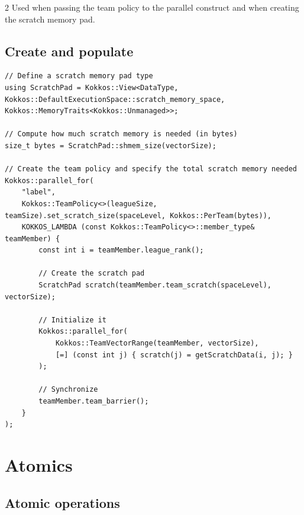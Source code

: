 \documentclass[
    kokkoshighlight,
]{./cheat_sheet_kokkos}
\begin{document}
\begin{multicols}{2}
Used when passing the team policy to the parallel construct and when creating the scratch memory pad.

\subsection{Create and populate}

\begin{verbatim}
// Define a scratch memory pad type
using ScratchPad = Kokkos::View<DataType, Kokkos::DefaultExecutionSpace::scratch_memory_space, Kokkos::MemoryTraits<Kokkos::Unmanaged>>;

// Compute how much scratch memory is needed (in bytes)
size_t bytes = ScratchPad::shmem_size(vectorSize);

// Create the team policy and specify the total scratch memory needed
Kokkos::parallel_for(
    "label",
    Kokkos::TeamPolicy<>(leagueSize, teamSize).set_scratch_size(spaceLevel, Kokkos::PerTeam(bytes)),
    KOKKOS_LAMBDA (const Kokkos::TeamPolicy<>::member_type& teamMember) {
        const int i = teamMember.league_rank();

        // Create the scratch pad
        ScratchPad scratch(teamMember.team_scratch(spaceLevel), vectorSize);

        // Initialize it
        Kokkos::parallel_for(
            Kokkos::TeamVectorRange(teamMember, vectorSize),
            [=] (const int j) { scratch(j) = getScratchData(i, j); }
        );

        // Synchronize
        teamMember.team_barrier();
    }
);
\end{verbatim}

\section{Atomics}

\subsection{Atomic operations}


\end{multicols}
\end{document}
